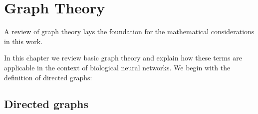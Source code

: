 \chapter{Graph Theory}\label{ch:Graph_theory} 

A review of graph theory lays the foundation for the mathematical
considerations in this work. 

 In this chapter we review basic graph
theory and explain how these terms are applicable in the context of
biological neural networks. We begin with the definition of directed
graphs: %










\section{Directed graphs}\label{sec:directed_graphs}





